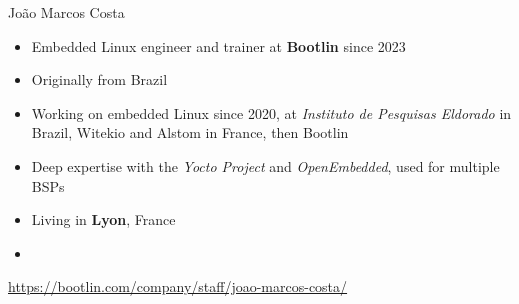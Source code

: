 \begin{frame}{João Marcos Costa}
  \begin{itemize}
  \item Embedded Linux engineer and trainer at {\bf Bootlin} since 2023
  \item Originally from Brazil
  \item Working on embedded Linux since 2020, at {\em Instituto de
    Pesquisas Eldorado} in Brazil, Witekio and Alstom in France, then
    Bootlin
  \item Deep expertise with the {\em Yocto Project} and {\em
    OpenEmbedded}, used for multiple BSPs
  \item Living in {\bf Lyon}, France
  \item {}
  \end{itemize}
  {\small \url{https://bootlin.com/company/staff/joao-marcos-costa/}}
\end{frame}
